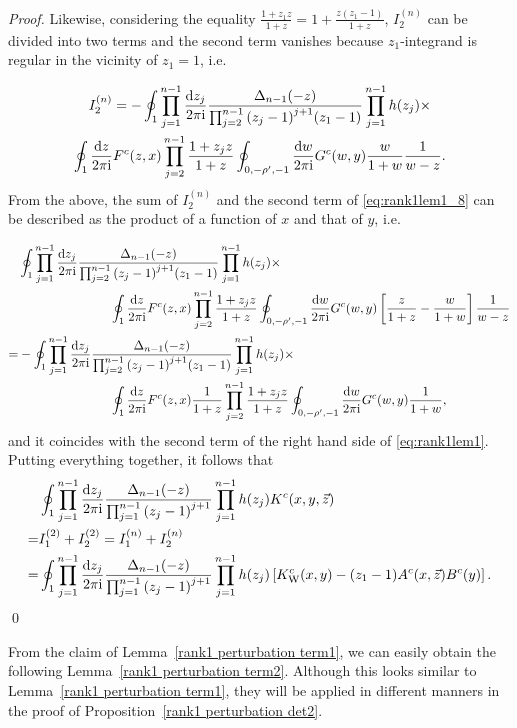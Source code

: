 \documentclass[cmp]{svjour}
\numberwithin{theorem}{section}
\numberwithin{equation}{section}
\def\dd{{\rm d}}
\def\ii{{\rm i}}
\begin{document}
\begin{proof}
Likewise, considering the equality $\frac{1 + z_1 z}{1 + z} =  1 + \frac{ z(z_1 - 1) }{1 + z} $, $I_2^{(n)}$ can be divided into two terms and the second term vanishes because $z_1$-integrand is regular in the vicinity of $z_1 = 1$, i.e.

\begin{multline*}
I_2^{(n)} =  - \oint_{1} \prod_{j=1}^{n-1}{ \frac{\dd z_j}{2 \pi \ii} } \frac{ \Delta_{n-1}(-z)}{ \prod_{j=2}^{n-1}{{(z_j -1)}^{j+1}} (z_1-1) } \prod_{j=1}^{n-1}{h(z_j)} \times \\
 \oint_{1} \frac{\dd z}{2 \pi \ii} F^c(z, x)   \prod_{j=2}^{n-1}{ \frac{1 + z_j z}{1 + z} }  \oint_{0 , - \rho' ,  -1  } \frac{\dd w}{2 \pi \ii} G^c(w, y) \frac{w}{1+w}   \frac{1}{w-z} .
\end{multline*}
From the above, the sum of $I_2^{(n)}$ and the second term of \eqref{eq:rank1lem1_8} can be described as the product of a function of $x$ and that of $y$, i.e.


\begin{align}
& \oint_{1} \prod_{j=1}^{n-1}{ \frac{\dd z_j}{2 \pi \ii} } \frac{ \Delta_{n-1}(-z)}{ \prod_{j=2}^{n-1}{{(z_j -1)}^{j+1}} (z_1 - 1) } \prod_{j=1}^{n-1}{h(z_j)} \times \nonumber \\
& \hspace{1in} \oint_{1} \frac{\dd z}{2 \pi \ii} F^c(z, x)   \prod_{j=2}^{n-1}{ \frac{1 + z_j z}{1 + z} } \oint_{0 , - \rho' , -1  } \frac{\dd w}{2 \pi \ii} G^c(w, y) \left[ \frac{z}{1 +z} - \frac{w}{1 + w} \right]  \frac{1}{w-z} \nonumber \\
= & -  \oint_{1} \prod_{j=1}^{n-1}{ \frac{\dd z_j}{2 \pi \ii} } \frac{ \Delta_{n-1}(-z)}{ \prod_{j=2}^{n-1}{{(z_j -1)}^{j+1}} (z_1 - 1) } \prod_{j=1}^{n-1}{h(z_j)} \times \nonumber \\
& \hspace{1in}   \oint_{1} \frac{\dd z}{2 \pi \ii} F^c(z, x) \frac{1}{1 + z}   \prod_{j=2}^{n-1}{ \frac{1 + z_j z}{1 + z} }   \oint_{0 , - \rho' , -1  } \frac{\dd w}{2 \pi \ii} G^c(w, y)  \frac{1}{1 + w}, \nonumber 
\end{align}
and it coincides with the second term of the right hand side of \eqref{eq:rank1lem1}. Putting everything together, it follows that
\begin{align}
&\oint_{1} \prod_{j=1}^{n-1}{ \frac{\dd z_j}{2 \pi \ii} } \frac{ \Delta_{n-1}(-z) }{ \prod_{j=1}^{n-1}{{(z_j -1)}^{j+1}}} \prod_{j=1}^{n-1}{h(z_j)} K^c(x , y, \vec{z})  \nonumber \\
=& I_1^{(2)} + I_2^{(2)} = I_1^{(n)} + I_2^{(n)} \nonumber  \\
=& \oint_{1} \prod_{j=1}^{n-1}{ \frac{\dd z_j}{2 \pi \ii} } \frac{ \Delta_{n-1}(-z) }{ \prod_{j=1}^{n-1}{{(z_j -1)}^{j+1}}} \prod_{j=1}^{n-1}{h(z_j)} \left[ K^c_{\mathrm{W}}(x , y) - (z_1 - 1) A^c(x, \vec{z})  B^c(y) \right]. \nonumber
\end{align}
\qed
\end{proof}
From the claim of Lemma~\ref{rank1 perturbation term1}, we can easily obtain the following Lemma~\ref{rank1 perturbation term2}.
Although this looks similar to Lemma~\ref{rank1 perturbation term1}, they will be applied in different manners  in the proof of Proposition~\ref{rank1 perturbation det2}.
\end{document}
